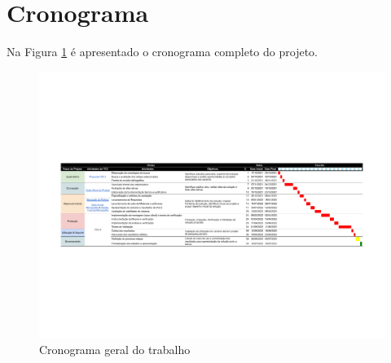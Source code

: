 \section{Cronograma}
Na Figura \ref{fig:cronograma} é apresentado o cronograma completo do projeto.

\begin{landscape}
    \begin{figure}[!ht]
        \centering
        \includegraphics[width=1\linewidth]{04-figuras/TCC cronograma - Sheet1.pdf}
        \caption{Cronograma geral do trabalho}
        \label{fig:cronograma}
    \end{figure}
\end{landscape}